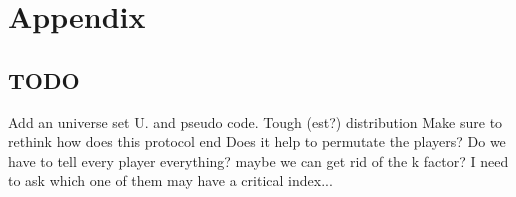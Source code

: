 \documentclass{article}
\theoremstyle{plain}
\begin{document}
\section{Appendix}


\subsection{TODO}
Add an universe set U. and pseudo code. 
Tough (est?) distribution\newline
Make sure to rethink how does this protocol end \newline
Does it help to permutate the players? \newline
Do we have to tell every player everything? maybe we can get rid of the k factor? I need to ask which one of them may have a critical index... \newline
\end{document}

